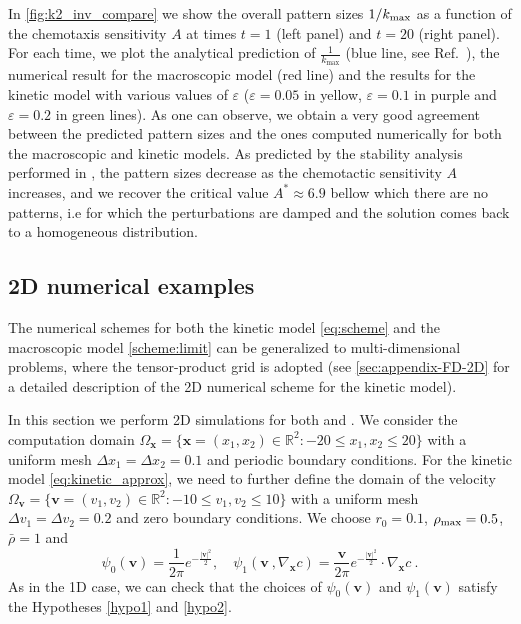 \documentclass[review,onefignum,onetabnum]{siamart220329}
\newcommand {\e}  {\varepsilon}
\begin{document}
In \cref{fig:k2_inv_compare} we show the overall pattern sizes $1/k_{\rm max}$ as a function of the chemotaxis sensitivity $A$ {at times $t=1$ (left panel) and $t=20$ (right panel). For each time, we plot the analytical prediction of $\frac{1}{k_{\max}}$ (blue line, see Ref.~\cite{almeida2020treatment}), the numerical result for the macroscopic model (red line) and the results for the kinetic model with various values of $\e$ ($\e = 0.05$ in yellow, $\e = 0.1$ in purple and $\e = 0.2$ in green lines). 
As one can observe, we obtain a very good agreement between the predicted pattern sizes and the ones computed numerically for both the macroscopic and kinetic models. As predicted by the stability analysis performed in \cite{almeida2020treatment}, the pattern sizes decrease as the chemotactic sensitivity $A$ increases, and we recover the critical value $A^* \approx 6.9$ bellow which there are no patterns, i.e for which the perturbations are damped and the solution comes back to a homogeneous distribution. }


\subsection{2D numerical examples}
The numerical schemes for both the kinetic model \cref{eq:scheme} and the macroscopic model \cref{scheme:limit} can be generalized to multi-dimensional problems, where the tensor-product grid is adopted {(see \cref{sec:appendix-FD-2D} for a detailed description of the 2D numerical scheme for the kinetic model)}. 

In this section we perform 2D simulations for both  {} and  {}. 
We consider the computation domain $\Omega_\mathbf{x} = \{\mathbf{x} = (x_1,x_2)\in\mathbb{R}^2: -20\le x_1, x_2 \le 20\}$ with a uniform mesh $\Delta x_1 = \Delta x_2 = 0.1$ and periodic boundary conditions.  
For the kinetic model \cref{eq:kinetic_approx}, we need to further define the domain of the velocity $\Omega_\mathbf{v} = \{\mathbf{v} = (v_1,v_2)\in\mathbb{R}^2: -10\le v_1, v_2 \le 10\}$ with a uniform mesh $\Delta v_1 = \Delta v_2 = 0.2$ and zero boundary conditions. 
We choose $r_0=0.1$, $\rho_{\rm max} = 0.5$, $\bar{\rho} = 1$ and 
\begin{equation*}
    \psi_0(\mathbf{v}) = \frac{1}{2\pi} e^{-\frac{|\mathbf{v}|^2}{2}}, \quad \psi_1(\mathbf{v}\ , \nabla_\mathbf{x} c) = \frac{\mathbf{v}}{2\pi} e^{-\frac{|\mathbf{v}|^2}{2}}\cdot \nabla_\mathbf{x} c\ .
\end{equation*}
As in the 1D case, we can check that the choices of $\psi_0(\mathbf{v})$ and $\psi_1(\mathbf{v})$ satisfy the Hypotheses \cref{hypo1} and \cref{hypo2}.
\end{document}
